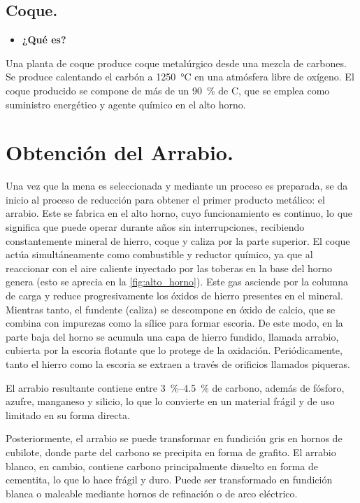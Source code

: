 \documentclass[12pt,a4paper]{article}
\begin{document}
\subsection{Coque.}
\begin{itemize}
    \item \textbf{¿Qué es?}
\end{itemize}

Una planta de coque produce coque metalúrgico desde una mezcla de carbones. Se produce calentando el carbón a \SI{1250}{\celsius} en una atmósfera libre de oxígeno. El coque producido se compone de más de un \SI{90}{\percent} de C, que se emplea como suministro energético y agente químico en el alto horno.

\section{Obtención del Arrabio.}

Una vez que la mena es seleccionada y mediante un proceso es preparada, se da inicio al proceso de reducción para obtener el primer producto metálico: el arrabio. Este se fabrica en el alto horno, cuyo funcionamiento es continuo, lo que significa que puede operar durante años sin interrupciones, recibiendo constantemente mineral de hierro, coque y caliza por la parte superior. El coque actúa simultáneamente como combustible y reductor químico, ya que al reaccionar con el aire caliente inyectado por las toberas en la base del horno genera  (esto se aprecia en la \autoref{fig:alto_horno}). Este gas asciende por la columna de carga y reduce progresivamente los óxidos de hierro presentes en el mineral. Mientras tanto, el fundente (caliza) se descompone en óxido de calcio, que se combina con impurezas como la sílice para formar escoria. De este modo, en la parte baja del horno se acumula una capa de hierro fundido, llamada arrabio, cubierta por la escoria flotante que lo protege de la oxidación. Periódicamente, tanto el hierro como la escoria se extraen a través de orificios llamados piqueras. 

El arrabio resultante contiene entre \SIrange[range-units=single]{3}{4,5}{\percent} de carbono, además de fósforo, azufre, manganeso y silicio, lo que lo convierte en un material frágil y de uso limitado en su forma directa.

Posteriormente, el arrabio se puede transformar en fundición gris en hornos de cubilote, donde parte del carbono se precipita en forma de grafito.
El arrabio blanco, en cambio, contiene carbono principalmente disuelto en forma de cementita, lo que lo hace frágil y duro. Puede ser transformado en fundición blanca o maleable mediante hornos de refinación o de arco eléctrico.
\end{document}
